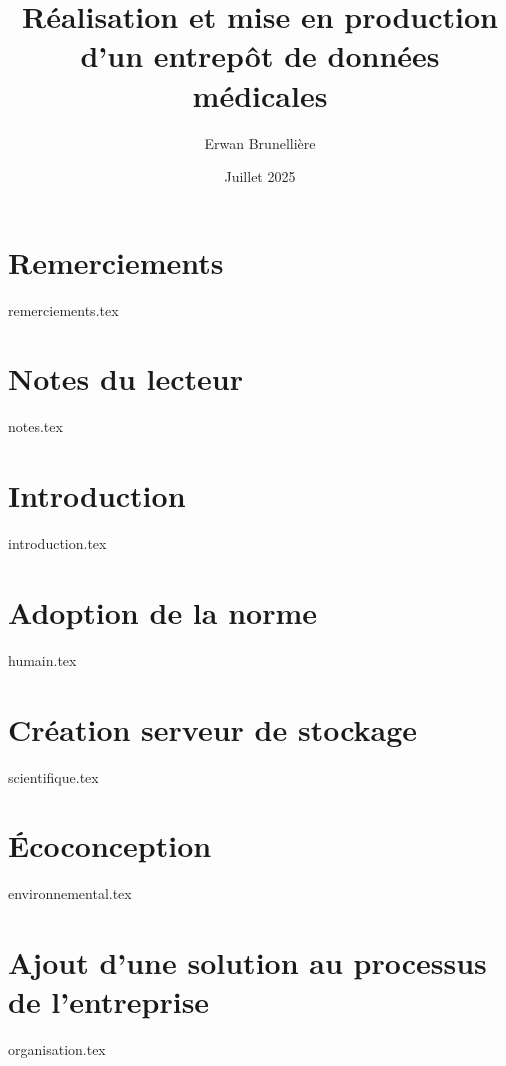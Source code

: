 \documentclass{memoireStyle}
\title{Réalisation et mise en production d'un entrepôt de données médicales}
\author{Erwan Brunellière}
\affil{IDIA 2025}
\affil{Polytech Nantes}
\date{Juillet 2025}
\begin{document}
\frontPage

\setStyle

\chapter*{Remerciements}
{remerciements.tex}

\chapter*{Notes du lecteur}
{notes.tex}

\printnoidxglossaries



\chapter{Introduction}
{introduction.tex}

\chapter{Adoption de la norme}
{humain.tex}

\chapter{Création serveur de stockage}
{scientifique.tex}

\chapter{Écoconception}
{environnemental.tex}

\chapter{Ajout d'une solution au processus de l'entreprise}
{organisation.tex}
\end{document}
